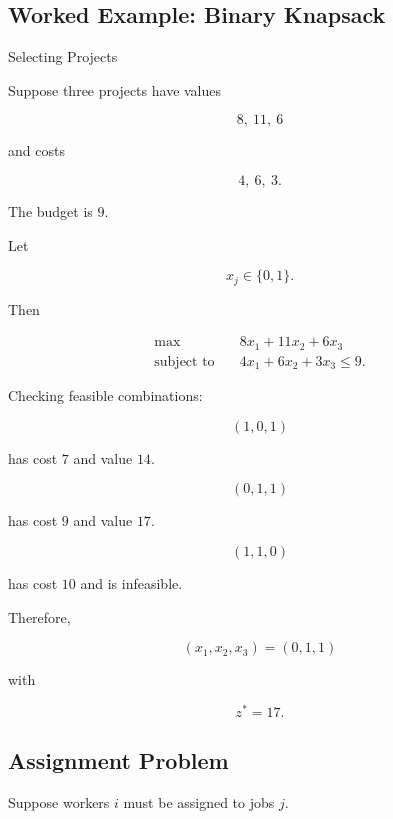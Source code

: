 \subsection{Worked Example: Binary Knapsack}
\label{subsec:worked-binary-knapsack}

\begin{workedexamplebox}{Selecting Projects}

Suppose three projects have values

\[
8,\ 11,\ 6
\]

and costs

\[
4,\ 6,\ 3.
\]

The budget is \(9\).

Let

\[
x_j\in\{0,1\}.
\]

Then

\[
\boxed{
\begin{aligned}
\max
\quad&
8x_1+11x_2+6x_3
\\
\text{subject to}
\quad&
4x_1+6x_2+3x_3
\leq9.
\end{aligned}
}
\]

Checking feasible combinations:

\[
(1,0,1)
\]

has cost \(7\) and value \(14\).

\[
(0,1,1)
\]

has cost \(9\) and value \(17\).

\[
(1,1,0)
\]

has cost \(10\) and is infeasible.

Therefore,

\begin{answerbox}
\[
\boxed{
(x_1,x_2,x_3)
=
(0,1,1)
}
\]

with

\[
\boxed{
z^*=17.
}
\]
\end{answerbox}

\end{workedexamplebox}

\subsection{Assignment Problem}
\label{subsec:integer-assignment-problem}

Suppose workers \(i\) must be assigned to jobs \(j\).

